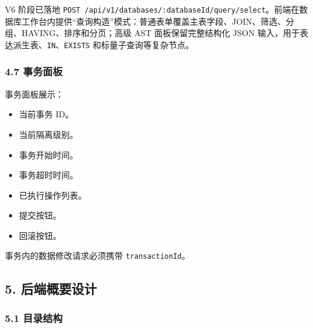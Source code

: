 \documentclass[
  a4paper,
  UTF8]{ctexart}
\providecommand{\tightlist}{%
  \setlength{\itemsep}{0pt}\setlength{\parskip}{0pt}}
\begin{document}
V6 阶段已落地
\texttt{POST\ /api/v1/databases/:databaseId/query/select}。前端在数据库工作台内提供``查询构造''模式：普通表单覆盖主表字段、JOIN、筛选、分组、HAVING、排序和分页；高级
AST 面板保留完整结构化 JSON
输入，用于表达派生表、\texttt{IN}、\texttt{EXISTS}
和标量子查询等复杂节点。

\hypertarget{ux4e8bux52a1ux9762ux677f}{%
\subsubsection{4.7 事务面板}\label{ux4e8bux52a1ux9762ux677f}}

事务面板展示：

\begin{itemize}
\tightlist
\item
  当前事务 ID。
\item
  当前隔离级别。
\item
  事务开始时间。
\item
  事务超时时间。
\item
  已执行操作列表。
\item
  提交按钮。
\item
  回滚按钮。
\end{itemize}

事务内的数据修改请求必须携带 \texttt{transactionId}。

\hypertarget{ux540eux7aefux6982ux8981ux8bbeux8ba1}{%
\subsection{5.
后端概要设计}\label{ux540eux7aefux6982ux8981ux8bbeux8ba1}}

\hypertarget{ux76eeux5f55ux7ed3ux6784}{%
\subsubsection{5.1 目录结构}\label{ux76eeux5f55ux7ed3ux6784}}
\end{document}
